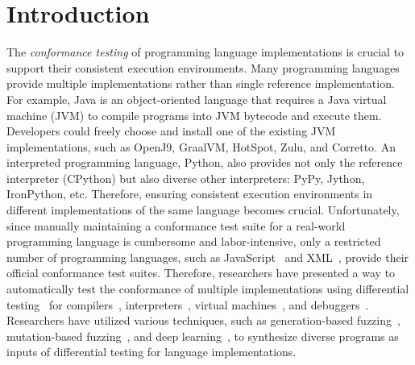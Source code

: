 \section{Introduction}\label{sec:intro}

The \textit{conformance testing} of programming language implementations is
crucial to support their consistent execution environments.
%
Many programming languages provide multiple implementations rather than single
reference implementation.
%
For example, Java is an object-oriented language that requires a Java virtual
machine (JVM) to compile programs into JVM bytecode and execute them.
%
Developers could freely choose and install one of the existing JVM
implementations, such as OpenJ9, GraalVM, HotSpot, Zulu, and Corretto.
%
An interpreted programming language, Python, also provides not only the
reference interpreter (CPython) but also diverse other interpreters: PyPy,
Jython, IronPython, etc.
%
Therefore, ensuring consistent execution environments in different
implementations of the same language becomes crucial.
%
Unfortunately, since manually maintaining a conformance test suite for
a real-world programming language is cumbersome and labor-intensive, only a
restricted number of programming languages, such as JavaScript~\cite{test262}
and XML~\cite{xml-test-suite}, provide their official conformance test suites.
%
Therefore, researchers have presented a way to automatically test the
conformance of multiple implementations using differential
testing~\cite{diff-test} for compilers~\cite{csmith, deep-smith, diff-cpp-front,
diff-test-embedded}, interpreters~\cite{jit-picking, comfort}, virtual
machines~\cite{java-diff-test}, and debuggers~\cite{diff-debugger}.
%
Researchers have utilized various techniques, such as generation-based
fuzzing~\cite{csmith, jit-picking, diff-test-embedded, diff-debugger},
mutation-based fuzzing~\cite{java-diff-test, diff-cpp-front}, and deep
learning~\cite{comfort, deep-smith}, to synthesize diverse programs as inputs of
differential testing for language implementations.


